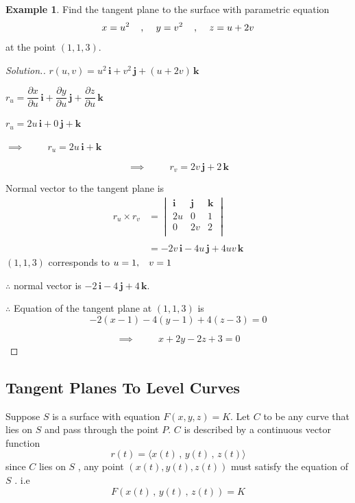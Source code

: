 \documentclass[11pt,a4paper]{article}
\theoremstyle{definition}
\newtheorem{exa}[thm]{Example}
\newenvironment{solution}
  {\renewcommand{\qedsymbol}{}\begin{proof}[\textit{Solution}.]}
  {\end{proof}}
\begin{document}
\begin{exa}


Find the tangent plane to the surface with parametric equation 
$$x =u^2\hspace{0.4cm},\hspace{0.4cm} y = v^2\hspace{0.4cm} , \hspace{0.4cm} z = u + 2v$$ at the point $(1,1,3)$.
\end{exa}


\begin{solution}


$r(u,v) = u^2 \,\textbf{i} + v^2\,\textbf{j} + (u + 2v)\,\textbf{k}$


$r_u = \dfrac{\partial x}{\partial u}\,\textbf{i} +  \dfrac{\partial y}{\partial u}\,\textbf{j} +  \dfrac{\partial z}{\partial u}\,\textbf{k}$


$r_u = 2u\,\textbf{i} + 0\,\textbf{j} + \textbf{k}$


$\implies\hspace{1cm} r_u = 2u\,\textbf{i} + \textbf{k}$


$$\implies \hspace{1cm} r_v = 2v\,\textbf{j}+ 2\,\textbf{k}$$

Normal vector to the tangent plane is 
\begin{align*}
r_u  \times r_v & = \begin{vmatrix}
\textbf{i} & \textbf{j} & \textbf{k}\\
2u & 0 & 1\\
0 & 2v & 2\\
\end{vmatrix}\\\\
& = -2v\,\textbf{i} -4u\,\textbf{j} + 4uv\,\textbf{k}
\end{align*}
$(1,1,3)$ corresponds to $u=1,\hspace{0.3cm} v =1$


$\therefore$ normal vector is $-2\,\textbf{i} -4\,\textbf{j} + 4\,\textbf{k}.$


$\therefore$ Equation of the tangent plane at $(1,1,3)$ is 
$$-2(x-1) -4(y-1) + 4(z-3) =0$$

$$\implies\hspace{1cm} x+ 2y -2z + 3 = 0$$
\end{solution}


{\color[wave]{485}\subsection{Tangent Planes To Level Curves}}
Suppose $S$ is a surface with equation $F(x,y,z) = K$. Let $C$ to be any curve that lies on $S$ and pass through the point $P$. $C$ is described by a continuous vector function $$r(t) = \langle x(t) \, ,\, y(t)\, , \,z(t)\rangle$$ since $C$ lies on $S$ , any point $(x(t), y(t),z(t))$ must satisfy the equation of $S$ . i.e $$F(x(t)\, ,\, y(t)\, , \,z(t)) = K$$
\end{document}
